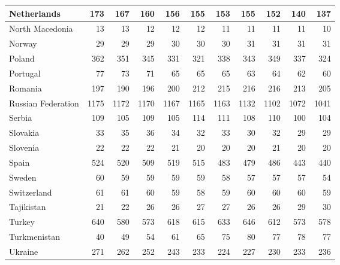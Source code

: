 \begin{table}
\begin{tabular}{|l|r|r|r|r|r|r|r|r|r|r|}
                   Netherlands&    173&    167&    160&    156&    155&    153&    155&    152&    140&    137\\\hline
               North Macedonia&     13&     13&     12&     12&     12&     11&     11&     11&     11&     10\\\hline
                        Norway&     29&     29&     29&     30&     30&     30&     31&     31&     31&     31\\\hline
                        Poland&    362&    351&    345&    331&    321&    338&    343&    349&    337&    324\\\hline
                      Portugal&     77&     73&     71&     65&     65&     65&     63&     64&     62&     60\\\hline
                       Romania&    197&    190&    196&    200&    212&    215&    216&    216&    213&    205\\\hline
            Russian Federation&   1175&   1172&   1170&   1167&   1165&   1163&   1132&   1102&   1072&   1041\\\hline
                        Serbia&    109&    105&    109&    105&    114&    111&    108&    110&    100&    104\\\hline
                      Slovakia&     33&     35&     36&     34&     32&     33&     30&     32&     29&     29\\\hline
                      Slovenia&     22&     22&     22&     21&     20&     20&     20&     21&     20&     20\\\hline
                         Spain&    524&    520&    509&    519&    515&    483&    479&    486&    443&    440\\\hline
                        Sweden&     60&     59&     59&     59&     59&     58&     57&     57&     57&     54\\\hline
                   Switzerland&     61&     61&     60&     59&     58&     59&     60&     60&     60&     59\\\hline
                    Tajikistan&     21&     22&     26&     26&     27&     27&     26&     26&     29&     30\\\hline
                        Turkey&    640&    580&    573&    618&    615&    633&    646&    612&    573&    578\\\hline
                  Turkmenistan&     40&     49&     54&     61&     65&     75&     80&     77&     78&     77\\\hline
                       Ukraine&    271&    262&    252&    243&    233&    224&    227&    230&    233&    236\\\hline

\end{tabular}
\end{table}
